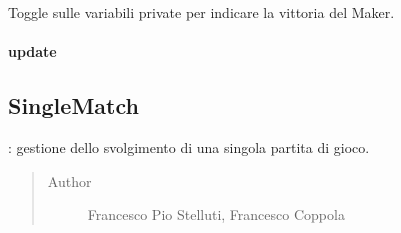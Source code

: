 \documentclass[letterpaper,10pt,italian,openany,oneside]{sphinxmanual}
\begin{document}
\begin{fulllineitems}
\label{\detokenize{source/it/unicam/cs/pa/mastermind/gamecore/MatchState:it.unicam.cs.pa.mastermind.gamecore.MatchState.toggleMakerWin()}}
Toggle sulle variabili private per indicare la vittoria del Maker.

\end{fulllineitems}



\paragraph{update}
\label{\detokenize{source/it/unicam/cs/pa/mastermind/gamecore/MatchState:update}}

\begin{fulllineitems}
\label{\detokenize{source/it/unicam/cs/pa/mastermind/gamecore/MatchState:it.unicam.cs.pa.mastermind.gamecore.MatchState.update()}}
\end{fulllineitems}



\subsection{SingleMatch}
\label{\detokenize{source/it/unicam/cs/pa/mastermind/gamecore/SingleMatch:singlematch}}\label{\detokenize{source/it/unicam/cs/pa/mastermind/gamecore/SingleMatch::doc}}

\begin{fulllineitems}
\label{\detokenize{source/it/unicam/cs/pa/mastermind/gamecore/SingleMatch:it.unicam.cs.pa.mastermind.gamecore.SingleMatch}}
: gestione dello svolgimento di una singola partita di gioco.
\begin{quote}\begin{description}
\item[{Author}] \leavevmode
Francesco Pio Stelluti, Francesco Coppola

\end{description}\end{quote}

\end{fulllineitems}
\end{document}
